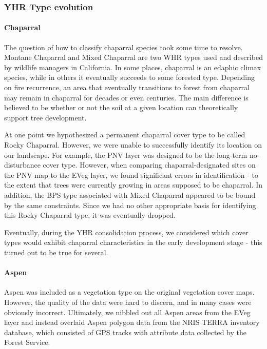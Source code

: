 \subsubsection{YHR Type evolution}

\paragraph{Chaparral}
The question of how to classify chaparral species took some time to resolve. Montane Chaparral and Mixed Chaparral are two WHR types used and described by wildlife managers in California. In some places, chaparral is an edaphic climax species, while in others it eventually succeeds to some forested type. Depending on fire recurrence, an area that eventually transitions to forest from chaparral may remain in chaparral for decades or even centuries. The main difference is believed to be whether or not the soil at a given location can theoretically support tree development. 

At one point we hypothesized a permanent chaparral cover type to be called Rocky Chaparral. However, we were unable to successfully identify its location on our landscape. For example, the PNV layer was designed to be the long-term no-disturbance cover type. However, when comparing chaparral-designated sites on the PNV map to the EVeg layer, we found significant errors in identification - to the extent that trees were currently growing in areas supposed to be chaparral. In addition, the BPS type associated with Mixed Chaparral appeared to be bound by the same constraints. Since we had no other appropriate basis for identifying this Rocky Chaparral type, it was eventually dropped.

Eventually, during the YHR consolidation process, we considered which cover types would exhibit chaparral characteristics in the early development stage - this turned out to be true for several.

\paragraph{Aspen}
Aspen was included as a vegetation type on the original vegetation cover maps. However, the quality of the data were hard to discern, and in many cases were obviously incorrect. Ultimately, we nibbled out all Aspen areas from the EVeg layer and instead overlaid Aspen polygon data from the NRIS TERRA inventory database, which consisted of GPS tracks with attribute data collected by the Forest Service.

